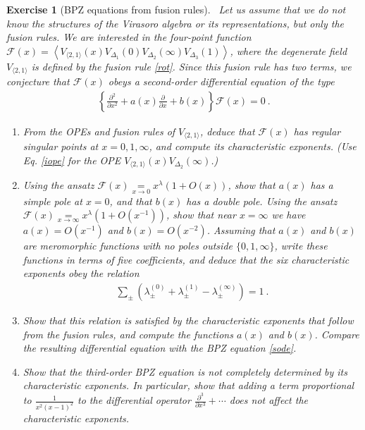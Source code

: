 \documentclass[12pt, a4paper, notitlepage, twoside]{report}
\numberwithin{equation}{section}
\theoremstyle{break}
\newtheorem{exo}{Exercise}[chapter]
\begin{document}
\begin{exo}[BPZ equations from fusion rules]
 ~\label{exoefr}
Let us assume that we do not know the structures of the Virasoro algebra or its representations, but only the fusion rules. We are interested in the four-point function $\mathcal{F}(x) = \left\langle V_{\langle 2,1 \rangle}(x)V_{\Delta_1}(0)V_{\Delta_2}(\infty)V_{\Delta_3}(1)\right\rangle$, where the degenerate field $V_{\langle 2,1 \rangle}$ is defined by the fusion rule \eqref{rot}. Since this fusion rule has two terms, we conjecture that $\mathcal{F}(x)$ obeys a second-order differential equation of the type 
\begin{align}
 \left\{\frac{\partial^2}{\partial x^2} + a(x) \frac{\partial}{\partial x} + b(x) \right\} \mathcal{F}(x) = 0 \ .
\end{align}
\begin{enumerate}
\item From the OPEs and fusion rules of $V_{\langle 2,1\rangle}$, deduce that $\mathcal{F}(x)$ has regular singular points at $x=0,1,\infty$, and compute its characteristic exponents. (Use Eq. \eqref{iope} for the OPE $V_{\langle 2,1 \rangle}(x)V_{\Delta_2}(\infty)$.)
\item Using the ansatz $\mathcal{F}(x)\underset{x\to 0}{=}x^\lambda(1+O(x))$, show that $a(x)$ has a simple pole at $x=0$, and that $b(x)$ has a double pole. Using the ansatz $\mathcal{F}(x)\underset{x\to \infty}{=}x^\lambda(1+O(x^{-1}))$, show that near $x=\infty$ we have $a(x)=O(x^{-1})$ and $b(x)= O(x^{-2})$. Assuming that $a(x)$ and $b(x)$ are meromorphic functions with no poles outside $\{0,1,\infty\}$, write these functions in terms of five coefficients, and deduce that the six characteristic exponents obey the relation
\begin{align}
 \sum_\pm \left(\lambda^{(0)}_\pm + \lambda^{(1)}_\pm -\lambda^{(\infty)}_\pm\right) = 1\ .
\end{align}
\item Show that this relation is satisfied by the characteristic exponents that follow from the fusion rules, and compute the functions $a(x)$ and $b(x)$. Compare the resulting differential equation with the BPZ equation \eqref{sode}.
 \item Show that the third-order BPZ equation is not completely determined by its characteristic exponents. In particular, show that adding a term proportional to $\frac{1}{x^2(x-1)^2}$ to the differential operator $\frac{\partial^3}{\partial x^3} + \cdots$ does not affect the characteristic exponents.
\end{enumerate}

\end{exo}
\end{document}

